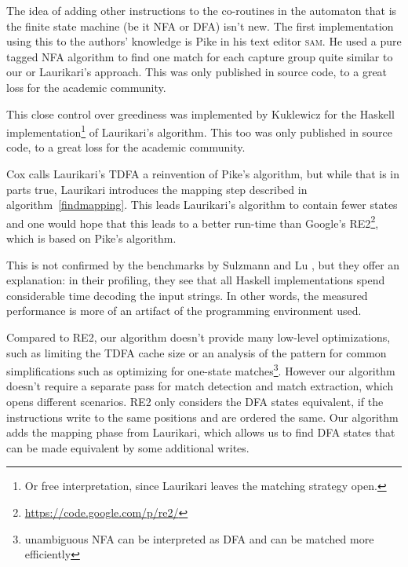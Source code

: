 \documentclass[11pt,a4paper,twoside,openright]{Thesis}
\theoremstyle{definition}
\begin{document}
The idea of adding other instructions to the co-routines in the automaton
that is the finite state machine (be it NFA or DFA) isn't new. The first
implementation using this to the authors' knowledge is Pike\cite{Pike87a} in
his text editor \textsc{sam}. He used a pure tagged NFA algorithm to find one
match for each capture group quite similar to our or Laurikari's approach. This
was only published in source code, to a great loss for the academic community.

This close control over greediness was implemented by Kuklewicz\cite{Kukl07a}
for the Haskell implementation\footnote{Or free interpretation, since 
Laurikari leaves the matching strategy open.} of Laurikari's algorithm. This too was only
published in source code, to a great loss for the academic community.

Cox calls Laurikari's TDFA a reinvention of Pike's algorithm, but while that 
is in parts true, Laurikari introduces the mapping step described in 
algorithm~\ref{findmapping}. This leads Laurikari's algorithm to contain 
fewer states and one would hope that this leads to a better run-time than 
Google's \textsc{RE2}\footnote{\url{https://code.google.com/p/re2/}},
which is based on Pike's algorithm. 

This is not confirmed by the benchmarks by Sulzmann and Lu
\cite{Sulz12a}, but they offer an explanation: in their profiling, they see
that all Haskell implementations spend considerable time decoding the input
strings. In other words, the measured performance is more of an artifact of the
programming environment used.

Compared to \textsc{RE2}, our algorithm doesn't provide many low-level optimizations,
such as limiting the TDFA cache size or an analysis of the pattern for common
simplifications such as optimizing for one-state matches\footnote{unambiguous
NFA can be interpreted as DFA and can be matched more efficiently}. However
our algorithm doesn't require a separate pass for match detection and match
extraction, which opens different scenarios. \textsc{RE2} only considers the
DFA states equivalent, if the instructions write to the same positions and are
ordered the same. Our algorithm adds the mapping phase from Laurikari, which 
allows us to find DFA states that can be made equivalent by some additional writes.
\end{document}
